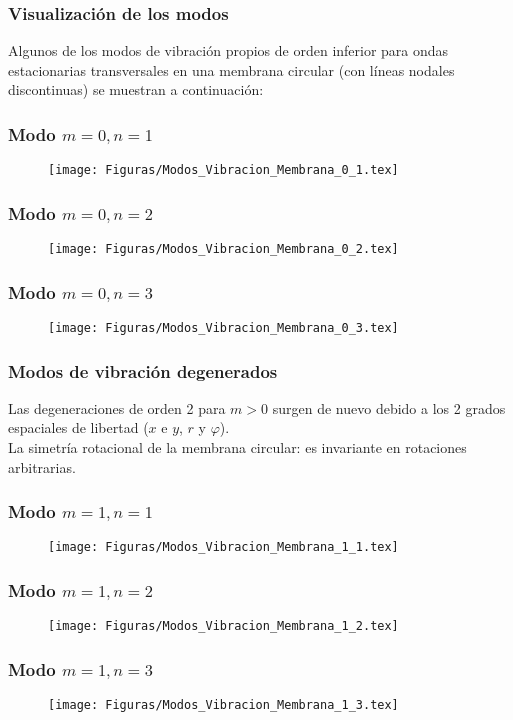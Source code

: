 \documentclass[12pt]{beamer}
\begin{document}
\begin{frame}
\frametitle{Visualización de los modos}
Algunos de los modos de vibración propios de orden inferior para ondas estacionarias transversales en una membrana circular (con líneas nodales discontinuas) se muestran a continuación:
\end{frame}
\begin{frame}
\frametitle{Modo $m=0, n=1$}
\begin{figure}
    \centering
    \texttt{[image: Figuras/Modos\_Vibracion\_Membrana\_0\_1.tex]}
\end{figure}
\end{frame}
\begin{frame}
\frametitle{Modo $m=0, n=2$}
\begin{figure}
    \centering
    \texttt{[image: Figuras/Modos\_Vibracion\_Membrana\_0\_2.tex]}
\end{figure}
\end{frame}
\begin{frame}
\frametitle{Modo $m=0, n=3$}
\begin{figure}
    \centering
    \texttt{[image: Figuras/Modos\_Vibracion\_Membrana\_0\_3.tex]}
\end{figure}
\end{frame}
\begin{frame}
\frametitle{Modos de vibración degenerados}
Las degeneraciones de orden 2 para $m > 0$ surgen de nuevo debido a los 2 grados espaciales de libertad ($x$ e $y$, $r$ y $\varphi$).
\\
\bigskip
\pause
La simetría rotacional de la membrana circular: es invariante en rotaciones arbitrarias.
\end{frame}
\begin{frame}
\frametitle{Modo $m=1, n=1$}
\begin{figure}
    \centering
    \texttt{[image: Figuras/Modos\_Vibracion\_Membrana\_1\_1.tex]}
\end{figure}
\end{frame}
\begin{frame}
\frametitle{Modo $m=1, n=2$}
\begin{figure}
    \centering
    \texttt{[image: Figuras/Modos\_Vibracion\_Membrana\_1\_2.tex]}
\end{figure}
\end{frame}
\begin{frame}
\frametitle{Modo $m=1, n=3$}
\begin{figure}
    \centering
    \texttt{[image: Figuras/Modos\_Vibracion\_Membrana\_1\_3.tex]}
\end{figure}
\end{frame}
\end{document}
